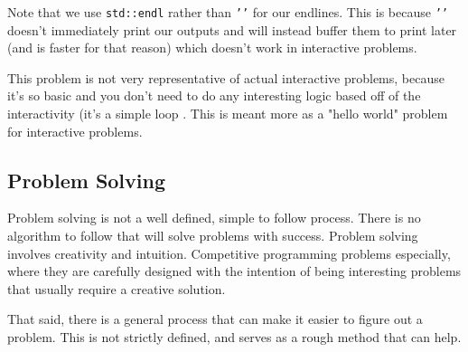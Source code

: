 Note that we use \texttt{std::endl} rather than \texttt{'\n'} for our endlines. This is because \texttt{'\n'} doesn't immediately print our outputs and will instead buffer them to print later (and is faster for that reason) which doesn't work in interactive problems.

This problem is not very representative of actual interactive problems, because it's so basic and you don't need to do any interesting logic based off of the interactivity (it's a simple loop . This is meant more as a "hello world" problem for interactive problems.

\subsection{Problem Solving}
 

Problem solving is not a well defined, simple to follow process. There is no algorithm to follow that will solve problems with success. Problem solving involves creativity and intuition. Competitive programming problems especially, where they are carefully designed with the intention of being interesting problems that usually require a creative solution.

That said, there is a general process that can make it easier to figure out a problem. This is not strictly defined, and serves as a rough method that can help.

